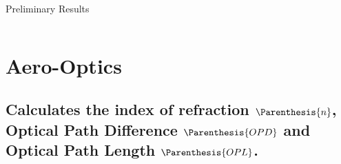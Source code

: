     \begin{frame}{Preliminary Results}
    \end{frame}

    \begin{frame}{$ $ }
        \Huge {}
    \end{frame}
    \section{Aero-Optics}
    \subsection{Calculates the index of refraction $\Parenthesis{n}$, Optical Path Difference $\Parenthesis{OPD}$ and Optical Path Length $\Parenthesis{OPL}$.}

